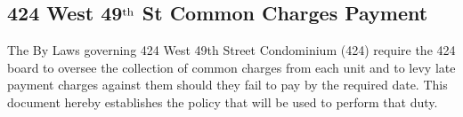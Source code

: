 



\thispagestyle{empty}

\begin{center}
\section*{{\huge 424 West 49$^{\textrm{\small th}}$ St Common Charges Payment}}
\end{center}


The By Laws governing 424 West 49th Street Condominium (424) require the 424 board to
oversee the collection of common charges from each unit and to levy late payment charges
against them should they fail to pay by the required date. This document hereby establishes the
policy that will be used to perform that duty.

\vspace{1cm}

